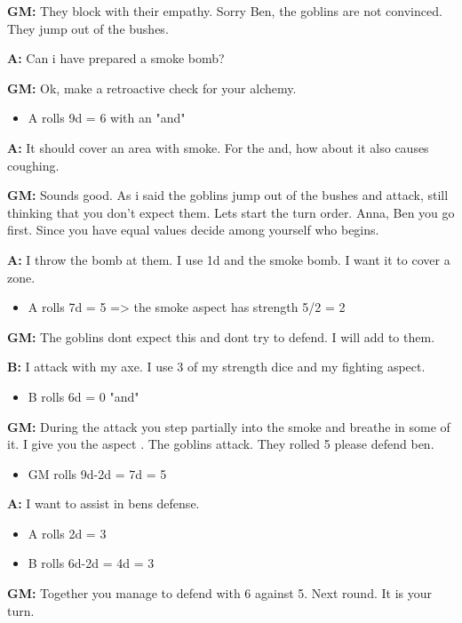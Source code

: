 \documentclass[11pt]{article}
\begin{document}
{\textbf{GM:} They block with their empathy. Sorry Ben, the goblins are not convinced. They jump out of the bushes.

\textbf{A:} Can i have prepared a smoke bomb?

\textbf{GM:} Ok, make a retroactive check for your alchemy.
\begin{itemize}
\item A rolls 9d = 6 with an "and"
\end{itemize}

\textbf{A:} It should cover an area with smoke. For the and, how about it also causes coughing.

\textbf{GM:} Sounds good. As i said the goblins jump out of the bushes and attack, still thinking that you don't expect them. Lets start the turn order. Anna, Ben you go first. Since you have equal values decide among yourself who begins.

\textbf{A:} I throw the bomb at them. I use 1d and the smoke bomb. I want it to cover a zone.
\begin{itemize}
\item A rolls 7d = 5 => the smoke aspect has strength 5/2 = 2
\end{itemize}

\textbf{GM:} The goblins dont expect this and dont try to defend. I will add  to them.

\textbf{B:} I attack with my axe. I use 3 of my strength dice and my fighting aspect.
\begin{itemize}
\item B rolls 6d = 0 "and"
\end{itemize}

\textbf{GM:} During the attack you step partially into the smoke and breathe in some of it. I give you the aspect . The goblins attack. They rolled 5 please defend ben.
\begin{itemize}
\item GM rolls 9d-2d = 7d = 5
\end{itemize}

\textbf{A:} I want to assist in bens defense.
\begin{itemize}
\item A rolls 2d = 3
\item B rolls 6d-2d = 4d = 3
\end{itemize}

\textbf{GM:} Together you manage to defend with 6 against 5. Next round. It is your turn.

}
\end{document}
